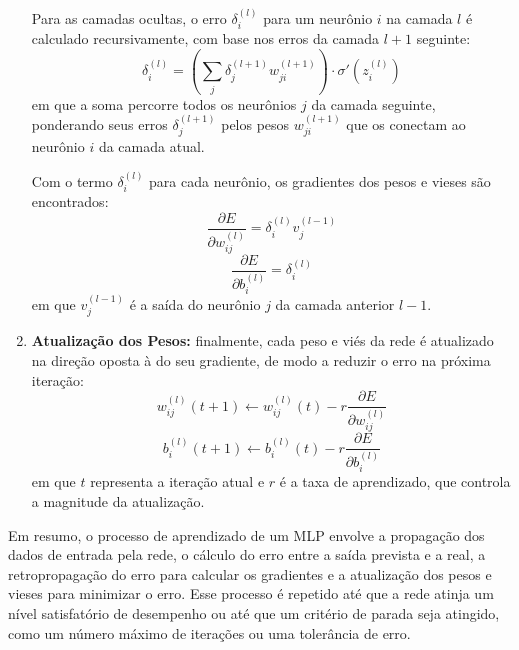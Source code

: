 \begin{enumerate}
Para as camadas ocultas, o erro $ \delta_i^{(l)} $ para um neurônio $ i $ na camada $ l $ é calculado recursivamente, 
com base nos erros da camada $ l+1 $ seguinte:
\begin{equation}
\label{eq:erro_oculta_v}
\delta_i^{(l)} = \left( \sum_{j} \delta_j^{(l+1)} w_{ji}^{(l+1)} \right) \cdot \sigma'(z_i^{(l)})
\end{equation}
em que a soma percorre todos os neurônios $j$ da camada seguinte, ponderando seus erros $\delta_j^{(l+1)}$ pelos 
pesos $w_{ji}^{(l+1)}$ que os conectam ao neurônio $i$ da camada atual.

Com o termo $\delta_i^{(l)}$ para cada neurônio, os gradientes dos pesos e vieses são encontrados:
\begin{equation}
\label{eq:gradiente_pesos_v}
\frac{\partial E}{\partial w_{ij}^{(l)}} = \delta_i^{(l)} v_j^{(l-1)}
\end{equation}
\begin{equation}
\label{eq:gradiente_bias_v}
\frac{\partial E}{\partial b_i^{(l)}} = \delta_i^{(l)}
\end{equation}
em que $v_j^{(l-1)}$ é a saída do neurônio $j$ da camada anterior $l-1$.

\item \textbf{Atualização dos Pesos:} finalmente, cada peso e viés da rede é atualizado na direção oposta à do seu gradiente, 
de modo a reduzir o erro na próxima iteração:
\begin{equation}
\label{eq:atualizacao_mlp_v}
w_{ij}^{(l)}(t+1) \leftarrow w_{ij}^{(l)}(t) - r \frac{\partial E}{\partial w_{ij}^{(l)}}
\end{equation}
\begin{equation}
\label{eq:atualizacao_bias_v}
b_i^{(l)}(t+1) \leftarrow b_i^{(l)}(t) - r \frac{\partial E}{\partial b_i^{(l)}}
\end{equation}
em que $t$ representa a iteração atual e $r$ é a taxa de aprendizado, que controla a magnitude da atualização.
\end{enumerate}

Em resumo, o processo de aprendizado de um MLP envolve a propagação dos dados de entrada pela rede, o cálculo do erro entre 
a saída prevista e a real, a retropropagação do erro para calcular os gradientes e a atualização dos pesos e vieses para 
minimizar o erro. Esse processo é repetido até que a rede atinja um nível satisfatório de desempenho ou até que um critério
de parada seja atingido, como um número máximo de iterações ou uma tolerância de erro.	


